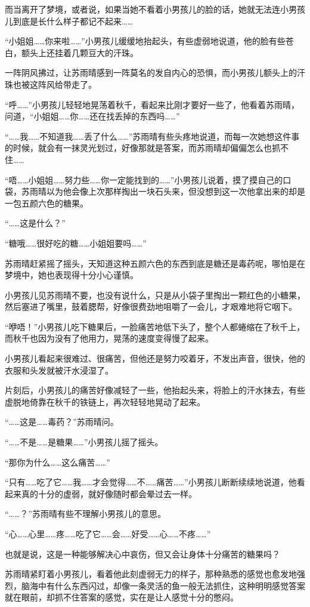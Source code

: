 而当离开了梦境，或者说，如果当她不看着小男孩儿的脸的话，她就无法连小男孩儿到底是长什么样子都记不起来……

“小姐姐……你来啦……”小男孩儿缓缓地抬起头，有些虚弱地说道，他的脸有些苍白，额头上还挂着几颗豆大的汗珠。

一阵阴风拂过，让苏雨晴感到一阵莫名的发自内心的恐惧，而小男孩儿额头上的汗珠也被这阵风给带走了。

“呼……”小男孩儿轻轻地晃荡着秋千，看起来比刚才要好一些了，他看着苏雨晴，问道，“小姐姐……你……还在找丢掉的东西吗……”

“……我……不知道我……丢了什么……”苏雨晴有些头疼地说道，而每一次她想这件事的时候，就会有一抹灵光划过，好像那就是答案，而苏雨晴却偏偏怎么也抓不住……

“唔……小姐姐……努力些……你一定能找到的……”小男孩儿说着，摸了摸自己的口袋，苏雨晴以为他会像上次那样掏出一块石头来，但没想到这一次他拿出来的却是一包五颜六色的糖果。

“……这是什么？”

“糖哦……很好吃的糖……小姐姐要吗……”

苏雨晴赶紧摇了摇头，天知道这种五颜六色的东西到底是糖还是毒药呢，哪怕是在梦境中，她也表现得十分小心谨慎。

小男孩儿见苏雨晴不要，也没有说什么，只是从小袋子里掏出一颗红色的小糖果，然后塞进了嘴里，鼓着腮帮，好像很费劲地咀嚼了一会儿，才艰难地将它咽下。

“咿唔！”小男孩儿吃下糖果后，一脸痛苦地低下头了，整个人都蜷缩在了秋千上，而秋千也因为没有了他用力，晃荡的速度变得慢了起来。

小男孩儿看起来很难过、很痛苦，但他还是努力咬着牙，不发出声音，很快，他的衣服和头发就被汗水浸湿了。

片刻后，小男孩儿的痛苦好像减轻了一些，他抬起头来，将脸上的汗水抹去，有些虚脱地倚靠在秋千的铁链上，再次轻轻地晃动了起来。

“……这是……毒药？”苏雨晴问。

“……不是……是糖果……”小男孩儿摇了摇头。

“那你为什么……这么痛苦……”

“只有……吃了它……我……才会觉得……不……痛苦……”小男孩儿断断续续地说道，他看起来真的十分的虚弱，就好像随时都会晕过去一样。

“……？”苏雨晴有些不理解小男孩儿的意思。

“心……心里……疼……吃了它……会……好受……心……不疼……”

也就是说，这是一种能够解决心中哀伤，但又会让身体十分痛苦的糖果吗？

苏雨晴紧盯着小男孩儿，看着他此刻虚弱无力的样子，那种熟悉的感觉也愈发地强烈，脑海中有什么东西闪过，却像一条灵活的鱼一般无法抓住，这种明明感觉答案就在眼前，却抓不住答案的感觉，实在是让人感觉十分的憋闷。

